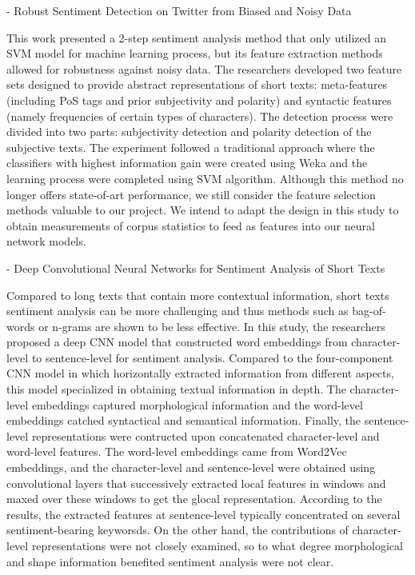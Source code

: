 \documentclass[12pt]{diazessay} %
\begin{document}
- Robust Sentiment Detection on Twitter from Biased and Noisy Data \citep{barbosa2010}

This work presented a 2-step sentiment analysis method that only utilized an SVM model for machine learning process, but its feature extraction methods allowed for robustness against noisy data. The researchers developed two feature sets designed to provide abstract representations of short texts: meta-features (including PoS tags and prior subjectivity and polarity) and syntactic features (namely frequencies of certain types of characters). The detection process were divided into two parts: subjectivity detection and polarity detection of the subjective texts. The experiment followed a traditional approach where the classifiers with highest information gain were created using Weka and the learning process were completed using SVM algorithm. Although this method no longer offers state-of-art performance, we still consider the feature selection methods valuable to our project. We intend to adapt the design in this study to obtain measurements of corpus statistics to feed as features into our neural network models. 

- Deep Convolutional Neural Networks for Sentiment Analysis of Short Texts \citep{santos2014}

Compared to long texts that contain more contextual information, short texts sentiment analysis can be more challenging and thus methods such as bag-of-words or n-grams are shown to be less effective\citep{barbosa2010, santos2014}. In this study, the researchers proposed a deep CNN model that constructed word embeddings from character-level to sentence-level for sentiment analysis. Compared to the four-component CNN model in \citep{poria2017} which horizontally extracted information from different aspects, this model specialized in obtaining textual information in depth. The character-level embeddings captured morphological information and the word-level embeddings catched syntactical and semantical information. Finally, the sentence-level representations were contructed upon concatenated character-level and word-level features. The word-level embeddings came from Word2Vec embeddings, and the character-level and sentence-level were obtained using convolutional layers that successively extracted local features in windows and maxed over these windows to get the glocal representation. According to the results, the extracted features at sentence-level typically concentrated on several sentiment-bearing keyworsds. On the other hand, the contributions of character-level representations were not closely examined, so to what degree morphological and shape information benefited sentiment analysis were not clear. 
\end{document}
